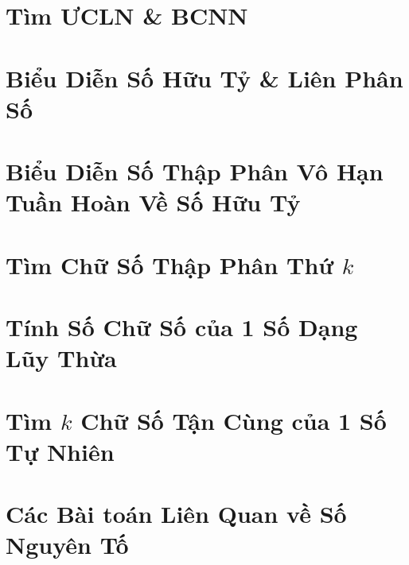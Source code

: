 \documentclass{article}
\begin{document}

\section{Tìm ƯCLN \& BCNN}


\section{Biểu Diễn Số Hữu Tỷ \& Liên Phân Số}


\section{Biểu Diễn Số Thập Phân Vô Hạn Tuần Hoàn Về Số Hữu Tỷ}


\section{Tìm Chữ Số Thập Phân Thứ $k$}


\section{Tính Số Chữ Số của 1 Số Dạng Lũy Thừa}


\section{Tìm $k$ Chữ Số Tận Cùng của 1 Số Tự Nhiên}


\section{Các Bài toán Liên Quan về Số Nguyên Tố}

\end{document}
